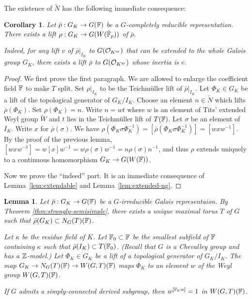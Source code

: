 \documentclass[10pt,a4paper,twoside]{article}
\newtheorem{lem}{Lemma}
\newtheorem{cor}{Corollary}
\begin{document}
The existence of $\widetilde{N}$ has the following immediate consequence:

\begin{cor}
\label{cor:lift-witt}
Let $\bar\rho: G_K \to G({\mathbb{F}})$ be a $G$-completely reducible representation.
There exists a lift $\rho: G_K \to G(W(\bar{\mathbb{F}}_p))$ of $\bar\rho$.

Indeed, for any lift $v$ of $\bar\rho|_{I_K}$
to $G(\mathcal{O}_{K^{\operatorname{ur}}})$ that can be extended to the whole Galois group $G_K$,
there exists a lift $\bar\rho$ to $G(\mathcal{O}_{K^{\operatorname{ur}}})$
whose inertia is $v$.
\end{cor}

\begin{proof}
We first prove the first paragraph.
We are allowed to enlarge the coefficient field ${\mathbb{F}}$ to make $T$ split.
Set $\rho|_{I_K}$ to be the Teichm\"uller lift of $\bar\rho|_{I_K}$.
Let $\Phi_K\in G_K$ be a lift of the topological generator of $G_K/I_K$.
Choose an element $n \in \widetilde{N}$ which lifts $\bar\rho(\Phi_K)$.
Set $\rho(\Phi_K) = n$.
Write $n=wt$ where $w$ is an element of Tits' extended Weyl group $\widetilde{W}$
and $t$ lies in the Teichm\"uller lift of $T({\mathbb{F}})$.
Let $\sigma$ be an element of $I_K$.
Write $x$ for $\bar\rho(\sigma)$.
We have $\rho(\Phi_K\sigma \Phi_K^{-1}) = [\bar\rho (\Phi_K\sigma \Phi_K^{-1})]
=[w x w^{-1}]$.
By the proof of the previous lemma,
$[w x w^{-1}] = w [x] w^{-1} = w \rho(\sigma) w^{-1} = n \rho(\sigma) n^{-1}$,
and thus $\rho$ extends uniquely to a continuous homomorphism $G_K \to G(W({\mathbb{F}}))$.

Now we prove the ``indeed'' part.
It is an immediate consequence of Lemma~\ref{lem:extendable} and Lemma~\ref{lem:extended-ng}.
\end{proof}


\begin{lem}
\label{lem:exp-weyl}
Let $\bar\rho:G_K \to G({\mathbb{F}})$ be a $G$-irreducible Galois representaion.
By Theorem \ref{thm:strongly-semisimple}, there exists a unique maximal torus $T$ of $G$ such that $\bar\rho(G_K)\subset N_G(T)({\mathbb{F}})$.

Let $\kappa$ be the residue field of $K$.
Let ${\mathbb{F}}_0\subset {\mathbb{F}}$ be the smallest subfield of ${\mathbb{F}}$ containing $\kappa$ 
such that
$\bar\rho(I_K) \subset T({\mathbb{F}}_0)$.
(Recall that $G$ is a Chevalley group and has a ${\mathbb{Z}}$-model.)
Let $\Phi_K\in G_K$ be a lift of a topological generator of $G_K/I_K$.
The map $G_K \to N_G(T)({\mathbb{F}}) \to W(G,T)({\mathbb{F}})$ maps
$\Phi_K$ to an element $w$ of the Weyl group $W(G,T)({\mathbb{F}})$.

If $G$ admits a simply-connected derived subgroup, then $w^{[{\mathbb{F}}_0:\kappa]}=1$ in $W(G,T)({\mathbb{F}})$.
\end{lem}
\end{document}
